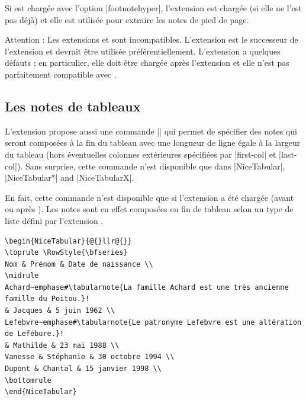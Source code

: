 \documentclass[dvipsnames]{article}%
\begin{document}
\smallskip
Si  est chargée avec l'option |footnotehyper|, l'extension
 est chargée (si elle ne l'est pas déjà) et elle est utilisée
pour extraire les notes de pied de page.

\smallskip
Attention : Les extensions  et  sont
incompatibles. L'extension  est le successeur de l'extension
 et devrait être utilisée préférentiellement. L'extension
 a quelques défauts ; en particulier, elle doit être chargée après
l'extension  et elle n'est pas parfaitement compatible avec
.



\subsection{Les notes de tableaux}

\label{tabularnote}

L'extension  propose aussi une commande |\tabularnote| qui
permet de spécifier des notes qui seront composées à la fin du tableau avec une
longueur de ligne égale à la largeur du tableau (hors éventuelles colonnes
extérieures spécifiées par |first-col| et |last-col|). Sans surprise, cette
commande n'est disponible que dans |{NiceTabular}|, |{NiceTabular*}| and
|{NiceTabularX}|. 

En fait, cette commande n'est disponible que si l'extension  a été
chargée (avant ou après ). Les notes sont en effet composées en
fin de tableau selon un type de liste défini par l'extension .

\begin{scope}
\begin{Verbatim}
\begin{NiceTabular}{@{}llr@{}}
\toprule \RowStyle{\bfseries}
Nom & Prénom & Date de naissance \\
\midrule
Achard~emphase#\tabularnote{La famille Achard est une très ancienne famille du Poitou.}!
& Jacques & 5 juin 1962 \\
Lefebvre~emphase#\tabularnote{Le patronyme Lefebvre est une altération de Lefébure.}!
& Mathilde & 23 mai 1988 \\
Vanesse & Stéphanie & 30 octobre 1994 \\
Dupont & Chantal & 15 janvier 1998 \\
\bottomrule
\end{NiceTabular}
\end{Verbatim}
\end{scope}
\end{document}
